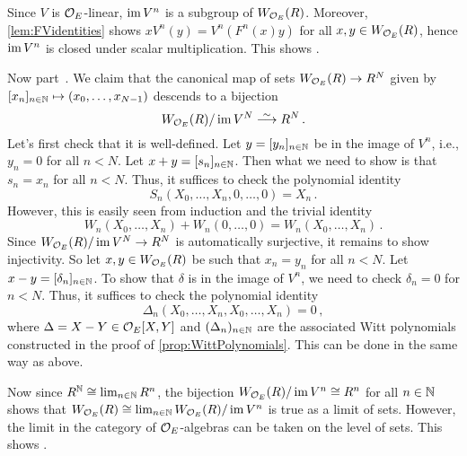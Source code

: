 \begin{proof*}
	Since $V$ is $\mathcal{O}_E$-linear, $\operatorname{im} V^n$ is a subgroup of $W_{\mathcal{O}_E}(R)$. Moreover, \cref{lem:FVidentities} shows $xV^n(y)=V^n(F^n(x)y)$ for all $x,y\in W_{\mathcal{O}_E}(R)$, hence $\operatorname{im} V^n$ is closed under scalar multiplication. This shows .
	
	Now part~. We claim that the canonical map of sets $W_{\Oo_E}(R)\morphism R^N$ given by $[x_n]_{n\in\mathbb{N}}\mapsto (x_0,\dotsc,x_{N-1})$ descends to a bijection
	\begin{equation*}
		W_{\Oo_E}(R)/\im V^N\isomorphism R^N\,.
	\end{equation*}
	Let's first check that it is well-defined. Let $y=[y_n]_{n\in \mathbb{N}}$ be in the image of $V^n$, i.e., $y_n=0$ for all $n< N$. Let $x+y=[s_n]_{n\in \mathbb{N}}$. Then what we need to show is that $s_n=x_n$ for all $n<N$. Thus, it suffices to check the polynomial identity
	\begin{equation*}
		S_n(X_0,\dotsc,X_n,0,\dotsc,0)=X_n\,.
	\end{equation*}
	However, this is easily seen from induction and the trivial identity
	\begin{equation*}
		W_n(X_0,\dotsc,X_n)+W_n(0,\dotsc,0)=W_n(X_0,\dotsc,X_n)\,.
	\end{equation*}
	Since $W_{\Oo_E}(R)/\im V^N\morphism R^N$ is automatically surjective, it remains to show injectivity. So let $x,y\in W_{\mathcal{O}_E}(R)$ be such that $x_n=y_n$ for all $n<N$. Let $x-y=[\delta_n]_{n\in\mathbb{N}}$. To show that $\delta$ is in the image of $V^n$, we need to check $\delta_n=0$ for $n<N$. Thus, it suffices to check the polynomial identity
	\begin{equation*}
		\Delta_n(X_0,\dotsc,X_n,X_0,\dotsc,X_n)=0\,,
	\end{equation*}
	where $\Delta=X-Y\in\mathcal{O}_E[X,Y]$ and $(\Delta_n)_{n\in\mathbb{N}}$ are the associated Witt polynomials constructed in the proof of \cref{prop:WittPolynomials}. This can be done in the same way as above.
	
	Now since $R^{\mathbb{N}}\cong \lim_{n\in\mathbb{N}}R^n$, the bijection $W_{\mathcal{O}_E}(R)/\operatorname{im} V^n\cong R^n$ for all $n\in \mathbb{N}$ shows that $W_{\mathcal{O}_E}(R)\cong \lim_{n\in\mathbb{N}}W_{\mathcal{O}_E}(R)/\operatorname{im} V^n$ is true as a limit of sets. However, the limit in the category of $\mathcal{O}_E$-algebras can be taken on the level of sets. This shows .
	

\end{proof*}
